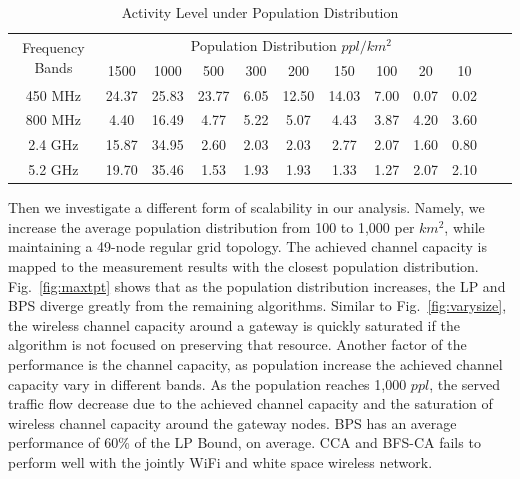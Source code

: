 \begin{table}
\centering %
\begin{tabular}{|c|c|c|c|c|c|c|c|c|c|c|c|} %
\hline %
 \multirow{2}{*}{Frequency Bands} & \multicolumn{9}{|c|}{Population Distribution $ppl/km^2$} \\
\cline{2-10}
		& 1500 & 1000 & 500 & 300 &  200 & 150 & 100 & 20 & 10 \\ %
\hline %
450 MHz &24.37	&25.83  &23.77	&6.05 &12.50  &14.03 & 7.00 & 0.07 & 0.02 \\      
\hline %
800 MHz &4.40 	&16.49  &4.77	&5.22&5.07 &4.43  & 3.87 & 4.20 & 3.60 \\      
\hline %
2.4 GHz &15.87 	&34.95  &2.60	&2.03&2.03 &2.77  & 2.07 & 1.60 & 0.80 \\      
\hline %
5.2 GHz &19.70	&35.46  &1.53	&1.93&1.93 &1.33  & 1.27 & 2.07 & 2.10 \\      
\hline %
\end{tabular}    
\caption{Activity Level under Population Distribution} %
\label{tab:activitymeasurement}    
\vspace{-0.3in}
\end{table}    

Then we investigate a different form of scalability in our analysis.  Namely,
we increase the average population distribution from 100 to 1,000 per $km^2$, while
maintaining a 49-node regular grid topology. The achieved channel capacity is mapped 
to the measurement results with the closest population distribution. 
%
%
Fig.~\ref{fig:maxtpt} shows that as the population distribution increases, the LP and 
BPS diverge greatly from the remaining algorithms. Similar to Fig.~\ref{fig:varysize}, 
the wireless channel capacity around a gateway is quickly saturated if the algorithm is 
not focused on preserving that resource. Another factor of the performance is the 
channel capacity, as population increase the achieved channel capacity vary in different 
bands. As the population reaches 1,000 $ppl$, the served traffic flow decrease due to the 
achieved channel capacity and the saturation of wireless channel capacity around the gateway
nodes. BPS has an average performance of 60\% of the LP Bound, on average. CCA and BFS-CA
fails to perform well with the jointly WiFi and white space wireless network. 

